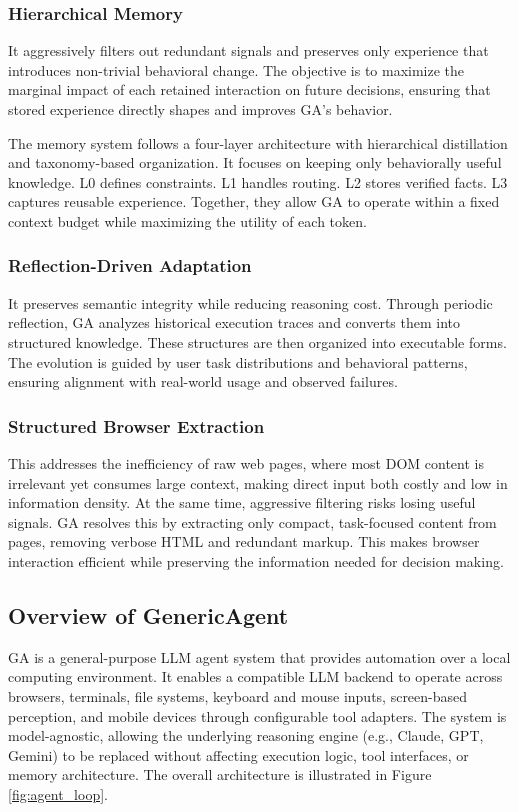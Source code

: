 \subsubsection{Hierarchical Memory} It aggressively filters out redundant signals and preserves only experience that introduces non-trivial behavioral change. The objective is to maximize the marginal impact of each retained interaction on future decisions, ensuring that stored experience directly shapes and improves GA's behavior.

The memory system follows a four-layer architecture with hierarchical distillation and taxonomy-based organization. It focuses on keeping only behaviorally useful knowledge. L0 defines constraints. L1 handles routing. L2 stores verified facts. L3 captures reusable experience. Together, they allow GA to operate within a fixed context budget while maximizing the utility of each token.

\subsubsection{Reflection-Driven Adaptation} It preserves semantic integrity while reducing reasoning cost. Through periodic reflection, GA analyzes historical execution traces and converts them into structured knowledge. These structures are then organized into executable forms. The evolution is guided by user task distributions and behavioral patterns, ensuring alignment with real-world usage and observed failures.


\subsubsection{Structured Browser Extraction} This addresses the inefficiency of raw web pages, where most DOM content is irrelevant yet consumes large context, making direct input both costly and low in information density. At the same time, aggressive filtering risks losing useful signals. GA resolves this by extracting only compact, task-focused content from pages, removing verbose HTML and redundant markup. This makes browser interaction efficient while preserving the information needed for decision making.

\subsection{Overview of GenericAgent}
\label{sec:overview}
GA is a general-purpose LLM agent system that provides automation over a local computing environment. It enables a compatible LLM backend to operate across browsers, terminals, file systems, keyboard and mouse inputs, screen-based perception, and mobile devices through configurable tool adapters. The system is model-agnostic, allowing the underlying reasoning engine (e.g., Claude, GPT, Gemini) to be replaced without affecting execution logic, tool interfaces, or memory architecture. The overall architecture is illustrated in Figure \ref{fig:agent_loop}.

